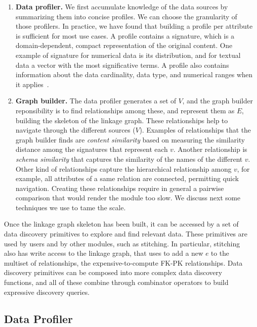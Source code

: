 \begin{enumerate}
\item {\bf Data profiler.} We first accumulate knowledge of the data sources by
summarizing them into concise profiles. We can choose the granularity of those
profilers. In practice, we have found that building a profile per attribute is
sufficient for most use cases. A profile contains a signature, which is a
domain-dependent, compact representation of the original content. One example of
signature for numerical data is its distribution, and for textual data a vector
with the most significative terms. A profile also contains information about the
data cardinality, data type, and numerical ranges when it
applies~\cite{profiling_survey}.  

\item {\bf Graph builder.} The data profiler generates a set of $V$, and the
graph builder reponsibility is to find relationships among these, and represent
them as $E$, building the skeleton of the linkage graph. These relationships
help to navigate through the different sources ($V$). Examples of relationships
that the graph builder finds are \emph{content similarity} based on measuring
the similarity distance among the signatures that represent each $v$. Another
relationship is \emph{schema similarity} that captures the similarity of the
names of the different $v$. Other kind of relationships capture the hierarchical
relationship among $v$, for example, all attributes of a same relation are
connected, permitting quick navigation. Creating these relationships require in
general a pairwise comparison that would render the module too slow. We discuss
next some techniques we use to tame the scale.
\end{enumerate}

Once the linkage graph skeleton has been built, it can be accessed by a set of
data discovery primitives to explore and find relevant data. These primitives
are used by users and by other modules, such as stitching. In particular,
stitching also has write access to the linkage graph, that uses to add a new $e$
to the multiset of relationships, the expensive-to-compute FK-PK relationships.
Data discovery primitives can be composed into more complex data discovery
functions, and all of these combine through combinator operators to build
expressive discovery queries.  

\subsection{Data Profiler}

